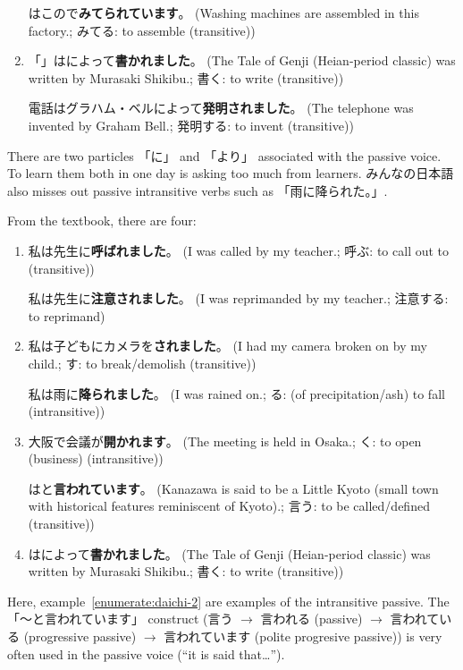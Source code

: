 \documentclass[../nihongo-gakushuu-kyouzai.tex]{subfiles}
\begin{document}
\begin{enumerate}[label=\arabic*.]
    はこので\textbf{みてられています}。 (Washing machines are assembled in this factory.; みてる: to assemble (transitive))

    \item 「」はによって\textbf{書かれました}。 (The Tale of Genji (Heian-period classic) was written by Murasaki Shikibu.; 書く: to write (transitive))

    電話はグラハム・ベルによって\textbf{発明されました}。 (The telephone was invented by Graham Bell.; 発明する: to invent (transitive))
\end{enumerate}

There are two particles 「に」 and 「より」 associated with the passive voice. To learn them both in one day is asking too much from learners. みんなの日本語 also misses out passive intransitive verbs such as 「雨に降られた。」.

From the  textbook, there are four:
\begin{enumerate}[label=\arabic*.]
    \item 私は先生に\textbf{呼ばれました}。 (I was called by my teacher.; 呼ぶ: to call out to (transitive))

    私は先生に\textbf{注意されました}。 (I was reprimanded by my teacher.; 注意する: to reprimand)

    \item \label{enumerate:daichi-2} 私は子どもにカメラを\textbf{されました}。 (I had my camera broken on by my child.; す: to break/demolish (transitive))

    私は雨に\textbf{降られました}。 (I was rained on.; る: (of precipitation/ash) to fall (intransitive))

    \item 大阪で会議が\textbf{開かれます}。 (The meeting is held in Osaka.; く: to open (business) (intransitive))

    はと\textbf{言われています}。 (Kanazawa is said to be a Little Kyoto (small town with historical features reminiscent of Kyoto).; 言う: to be called/defined (transitive))

    \item {}はによって\textbf{書かれました}。 (The Tale of Genji (Heian-period classic) was written by Murasaki Shikibu.; 書く: to write (transitive))
\end{enumerate}
Here, example~\eqref{enumerate:daichi-2} are examples of the intransitive passive. The 「〜と言われています」 construct (言う $\to$ 言われる (passive) $\to$ 言われている (progressive passive) $\to$ 言われています (polite progresive passive)) is very often used in the passive voice (``it is said that\dots'').
\end{document}

